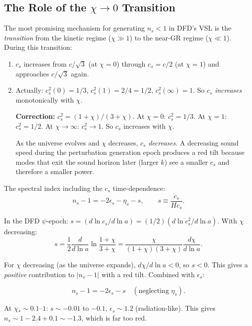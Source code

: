 \documentclass[11pt,a4paper]{article}
\begin{document}
\subsection{The Role of the $\chi \to 0$ Transition}

The most promising mechanism for generating $n_s < 1$ in DFD's VSL is the \emph{transition} from the kinetic regime ($\chi \gg 1$) to the near-GR regime ($\chi \ll 1$). During this transition:
\begin{enumerate}
\item $c_s$ increases from $c/\sqrt{3}$ (at $\chi = 0$) through $c_s = c/2$ (at $\chi = 1$) and approaches $c/\sqrt{3}$ again.
\item Actually: $c_s^2(0) = 1/3$, $c_s^2(1) = 2/4 = 1/2$, $c_s^2(\infty) = 1$. So $c_s$ \emph{increases} monotonically with $\chi$.

\textbf{Correction:} $c_s^2 = (1+\chi)/(3+\chi)$. At $\chi = 0$: $c_s^2 = 1/3$. At $\chi = 1$: $c_s^2 = 1/2$. At $\chi \to \infty$: $c_s^2 \to 1$. So $c_s$ increases with $\chi$.

As the universe evolves and $\chi$ decreases, $c_s$ \emph{decreases}. A decreasing sound speed during the perturbation generation epoch produces a red tilt because modes that exit the sound horizon later (larger $k$) see a smaller $c_s$ and therefore a smaller power.
\end{enumerate}

The spectral index including the $c_s$ time-dependence:
\begin{equation}
n_s - 1 = -2\epsilon_s - \eta_s - s, \qquad s \equiv \frac{\dot c_s}{H c_s}.
\end{equation}

In the DFD $\psi$-epoch: $s = (d\ln c_s/d\ln a) = (1/2)(d\ln c_s^2/d\ln a)$. With $\chi$ decreasing:
\begin{equation}
s = \frac{1}{2}\frac{d}{d\ln a}\ln\frac{1+\chi}{3+\chi} = \frac{\chi}{(1+\chi)(3+\chi)}\frac{d\chi}{d\ln a}.
\end{equation}

For $\chi$ decreasing (as the universe expands), $d\chi/d\ln a < 0$, so $s < 0$. This gives a \emph{positive} contribution to $|n_s - 1|$ with a red tilt. Combined with $\epsilon_s$:

\begin{equation}
n_s - 1 = -2\epsilon_s - s \quad (\text{neglecting } \eta_s).
\end{equation}

At $\chi_* \sim 0.1$--$1$: $s \sim -0.01$ to $-0.1$, $\epsilon_s \sim 1.2$ (radiation-like). This gives $n_s \sim 1 - 2.4 + 0.1 \sim -1.3$, which is far too red.
\end{document}
